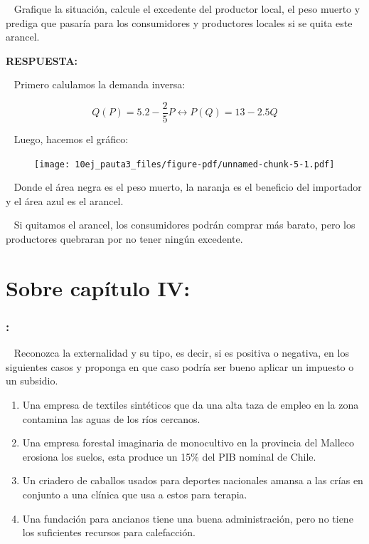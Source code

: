 \documentclass[
  letterpaper,
  DIV=11,
  numbers=noendperiod]{scrreport}
\begin{document}
~ Grafique la situación, calcule el excedente del productor local, el
peso muerto y prediga que pasaría para los consumidores y productores
locales si se quita este arancel.

\textbf{RESPUESTA:}

~ Primero calulamos la demanda inversa:

\[
Q(P)=5.2-\frac{2}{5}P \longleftrightarrow P(Q)=13-2.5Q
\]

~ Luego, hacemos el gráfico:

\begin{figure}

{\centering \texttt{[image: 10ej\_pauta3\_files/figure-pdf/unnamed-chunk-5-1.pdf]}

}

\end{figure}

~ Donde el área negra es el peso muerto, la naranja es el beneficio del
importador y el área azul es el arancel.

~ Si quitamos el arancel, los consumidores podrán comprar más barato,
pero los productores quebraran por no tener ningún excedente.


\hypertarget{sobre-capuxedtulo-iv-1}{%
\chapter{Sobre capítulo IV:}\label{sobre-capuxedtulo-iv-1}}

\hypertarget{section-34}{%
\subsection{:}\label{section-34}}

~ Reconozca la externalidad y su tipo, es decir, si es positiva o
negativa, en los siguientes casos y proponga en que caso podría ser
bueno aplicar un impuesto o un subsidio.

\begin{enumerate}
\def\labelenumi{\arabic{enumi})}
\item
  Una empresa de textiles sintéticos que da una alta taza de empleo en
  la zona contamina las aguas de los ríos cercanos.
\item
  Una empresa forestal imaginaria de monocultivo en la provincia del
  Malleco erosiona los suelos, esta produce un 15\% del PIB nominal de
  Chile.
\item
  Un criadero de caballos usados para deportes nacionales amansa a las
  crías en conjunto a una clínica que usa a estos para terapia.
\item
  Una fundación para ancianos tiene una buena administración, pero no
  tiene los suficientes recursos para calefacción.
\end{enumerate}
\end{document}
